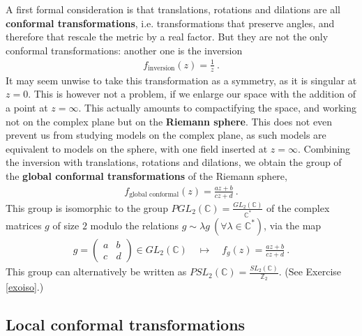 \documentclass[12pt, a4paper, notitlepage, twoside]{report}
\numberwithin{equation}{section}
\theoremstyle{break}
\begin{document}
A first formal consideration is that translations, rotations and dilations are all \textbf{\boldmath conformal transformations}, i.e. transformations that preserve angles, and therefore that rescale the metric by a real factor.
But they are not the only conformal transformations: another one is the inversion
\begin{align}
 f_\text{inversion}(z) = \frac{1}{z}\ .
\end{align}
It may seem unwise to take this transformation as a symmetry, as it is singular at $z=0$.
This is however not a problem, if we enlarge our space with the addition of a point at $z=\infty$.
This actually amounts to compactifying the space, and working not on the complex plane but on the \textbf{\boldmath Riemann sphere}.
This does not even prevent us from studying models on the complex plane, as such models are equivalent to models on the sphere, with one field inserted at $z=\infty$.
Combining the inversion with translations, rotations and dilations, we obtain the group of the \textbf{\boldmath global conformal transformations} of the Riemann sphere,
\begin{align}
 \boxed{f_\text{global conformal}(z)  = \frac{az+b}{cz+d}}\ .
\end{align}
This group is isomorphic to the group $PGL_2({\mathbb{C}})=\frac{GL_2({\mathbb{C}})}{\mathbb{C}^*}$ of the complex matrices $g$ of size $2$ modulo the relations $g\sim \lambda g\ (\forall \lambda\in\mathbb{C}^*)$, via the map
\begin{align}
 g = \left(\begin{array}{cc} a & b \\ c & d \end{array}\right) \in GL_2({\mathbb{C}}) \quad \longmapsto\quad f_g(z) = \frac{az+b}{cz+d}\ .
\label{gisl}
\end{align}
This group can alternatively be written as $PSL_2(\mathbb{C}) = \frac{SL_2(\mathbb{C})}{\mathbb{Z}_2}$.
(See Exercise \ref{exoiso}.) 


\subsection{Local conformal transformations \label{secloc}}
\end{document}
